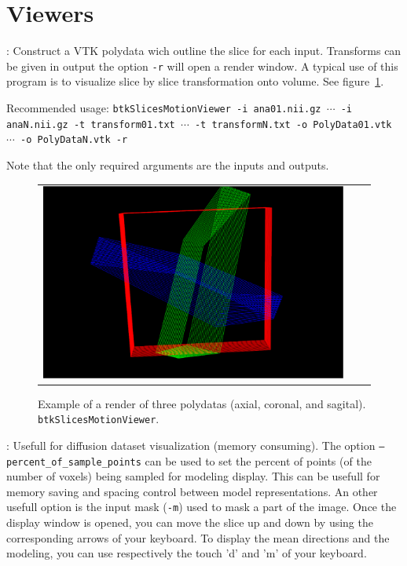 \newpage
\section{Viewers}
\label{sec:viewers}

\begin{description}
\item[btkSlicesMotionViewer]: Construct a VTK polydata wich outline the slice for each input. Transforms can be given in output the option \texttt{-r} will open a render window.
A typical use of this program is to visualize slice by slice transformation onto volume. See figure~\ref{fig:btkSlicesMotionViewer}.

Recommended usage: \texttt{btkSlicesMotionViewer -i ana01.nii.gz $\cdots$ -i anaN.nii.gz -t transform01.txt $\cdots$ -t transformN.txt -o PolyData01.vtk $\cdots$ -o PolyDataN.vtk -r }

Note that the only required arguments are the inputs and outputs.

\begin{figure}[t]
\centering
\begin{tabular}{ccc}
\includegraphics[width=0.5\columnwidth]{btkSlicesMotionViewer.eps}
\end{tabular}
\caption{Example of a render of three polydatas (axial, coronal, and sagital).
\texttt{btkSlicesMotionViewer}.}
\label{fig:btkSlicesMotionViewer}
\end{figure}

\item[btkDiffusionViewer]: Usefull for diffusion dataset visualization (memory consuming). The option \texttt{--percent\_of\_sample\_points} can be used to set the percent of points (of the number of voxels) being sampled for modeling display. This can be usefull for memory saving and spacing control between model representations. An other usefull option is the input mask (\texttt{-m}) used to mask a part of the image.
Once the display window is opened, you can move the slice up and down by using the corresponding arrows of your keyboard. To display the mean directions and the modeling, you can use respectively the touch 'd' and 'm' of your keyboard.

\end{description}

